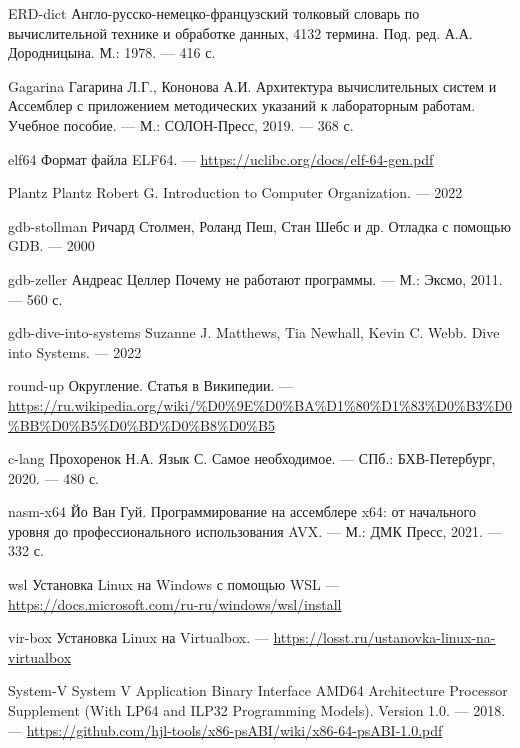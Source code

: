 \begin{thebibliography}{00}
\bibitem
{ERD-dict}
Англо-русско-немецко-французский толковый словарь по вычислительной технике и обработке данных, 4132 термина.
Под. ред. А.А. Дородницына. М.: 1978. --- 416 с.

\bibitem
{Gagarina}
Гагарина Л.Г., Кононова А.И.
Архитектура вычислительных систем и Ассемблер с приложением методических указаний к лабораторным работам. Учебное пособие.
--- М.: СОЛОН-Пресс, 2019. --- 368 с.

\bibitem
{elf64}
Формат файла ELF64.
--- \url{https://uclibc.org/docs/elf-64-gen.pdf}

\bibitem
{Plantz}
Plantz Robert G.
Introduction to Computer Organization.
--- 2022

\bibitem
{gdb-stollman}
Ричард Столмен, Роланд Пеш, Стан Шебс и др.
Отладка с помощью GDB.
--- 2000

\bibitem
{gdb-zeller}
Андреас Целлер
Почему не работают программы.
--- М.: Эксмо, 2011. --- 560 с.

\bibitem
{gdb-dive-into-systems}
Suzanne J. Matthews, Tia Newhall, Kevin C. Webb.
Dive into Systems.
--- 2022

\bibitem
{round-up}
Округление. Статья в Википедии.
--- \url{https://ru.wikipedia.org/wiki/%D0%9E%D0%BA%D1%80%D1%83%D0%B3%D0%BB%D0%B5%D0%BD%D0%B8%D0%B5}

\bibitem
{c-lang}
Прохоренок Н.А.
Язык С. Самое необходимое.
--- СПб.: БХВ-Петербург, 2020. --- 480 с.

\bibitem
{nasm-x64}
Йо Ван Гуй.
Программирование на ассемблере x64: от начального уровня до профессионального использования AVX.
--- М.: ДМК Пресс, 2021. --- 332 с.

\bibitem
{wsl}
Установка Linux на Windows с помощью WSL
--- \url{https://docs.microsoft.com/ru-ru/windows/wsl/install}

\bibitem
{vir-box}
Установка Linux на Virtualbox.
--- \url{https://losst.ru/ustanovka-linux-na-virtualbox}

\bibitem
{System-V}
System V Application Binary Interface AMD64 Architecture Processor Supplement (With LP64 and ILP32 Programming Models). Version 1.0. --- 2018.
--- \url{https://github.com/hjl-tools/x86-psABI/wiki/x86-64-psABI-1.0.pdf}



\end{thebibliography}
